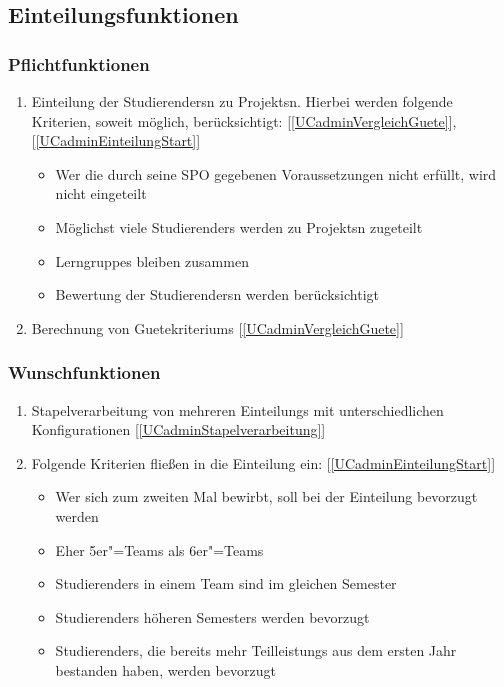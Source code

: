 \documentclass[parskip=full]{scrartcl}
\newcommand{\swtLabel}[1]{\textbf{/#1\arabic*0/}}
\newcommand{\testRef}[1]{[\ref{#1}]}
\begin{document}
\subsection{\gls{Einteilung}sfunktionen}
\subsubsection{Pflichtfunktionen}
\begin{enumerate}[label=\swtLabel{FA}, resume]
  \item \gls{Einteilung} der \glspl{Studierender}n zu \glspl{Projekt}n. Hierbei werden
  folgende Kriterien, soweit möglich, berücksichtigt: \testRef{UCadminVergleichGuete},
  \testRef{UCadminEinteilungStart}
  \begin{itemize}
    \item Wer die durch seine \gls{SPO} gegebenen Voraussetzungen nicht erfüllt,
    wird nicht eingeteilt \label{FAeinteilung}
    \item Möglichst viele \glspl{Studierender} werden zu \glspl{Projekt}n zugeteilt 
    \item \glspl{Lerngruppe} bleiben zusammen
    \item \gls{Bewertung} der \glspl{Studierender}n werden berücksichtigt 
 \end{itemize} \label{FAeinteilungMussKriterien} 
 \item Berechnung von \glspl{Guetekriterium} \label{FAguetekriterien}
 \testRef{UCadminVergleichGuete}
 
\end{enumerate}

 \subsubsection{Wunschfunktionen}
 
 \begin{enumerate}[label=\swtLabel{FA}, resume]
 \item Stapelverarbeitung von mehreren \glspl{Einteilung} mit unterschiedlichen
 Konfigurationen \label{FAeinteilungStapel} \testRef{UCadminStapelverarbeitung}
 \item Folgende Kriterien fließen in die \gls{Einteilung} ein:
 \testRef{UCadminEinteilungStart}
 \begin{itemize}
 	\item Wer sich zum zweiten Mal bewirbt, soll bei der \gls{Einteilung} bevorzugt
 	werden
 	\item Eher 5er"=\glspl{Team} als 6er"=\glspl{Team}
 	\item \glspl{Studierender} in einem \gls{Team} sind im gleichen Semester
 	\item \glspl{Studierender} höheren Semesters werden bevorzugt
 	\item \glspl{Studierender}, die bereits mehr \glspl{Teilleistung} aus dem ersten Jahr
 	bestanden haben, werden bevorzugt
 \end{itemize} \label{FAeinteilungWunschKriterien}
 
\end{enumerate}
\end{document}
